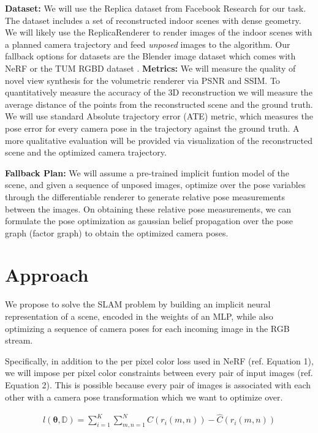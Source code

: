 \documentclass[15pt,letterpaper]{article}
\newcommand{\Db}{\mathbb{D}}
\newcommand{\thetav     }{\boldsymbol \theta     }
\begin{document}
\textbf{Dataset:} We will use the Replica dataset \cite{replica19arxiv} from Facebook Research for our task. The dataset includes a set of reconstructed indoor scenes with dense geometry. We will likely use the ReplicaRenderer to render images of the indoor scenes with a planned camera trajectory and feed \emph{unposed} images to the algorithm. Our fallback options for datasets are the Blender image dataset which comes with NeRF \cite{nerf} or the TUM RGBD dataset \cite{sturmBenchmarkEvaluationRGBD2012}.
{\bf Metrics:} We will measure the quality of novel view synthesis for the volumetric renderer via PSNR and SSIM. To quantitatively measure the accuracy of the 3D reconstruction we will measure the average distance of the points from the reconstructed scene and the ground truth. We will use standard Absolute trajectory error (ATE) metric, which measures the pose error for every camera pose in the trajectory against the ground truth. A more qualitative evaluation will be provided via visualization of the reconstructed scene and the optimized camera trajectory.

\textbf{Fallback Plan:} We will assume a pre-trained implicit funtion model of the scene, and given a sequence of unposed images, optimize over the pose variables through the differentiable renderer to generate relative pose measurements between the images. On obtaining these relative pose measurements, we can formulate the pose optimization as gaussian belief propagation over the pose graph (factor graph) to obtain the optimized camera poses.

\section{Approach}%
\label{sec:Approach}

We propose to solve the SLAM problem by building an implicit neural representation of a scene, encoded in the weights of an MLP, while also optimizing a sequence of camera poses for each incoming image in the RGB stream.

Specifically, in addition to the per pixel color loss used in NeRF (ref. Equation 1), we will impose per pixel color constraints between every pair of input images (ref. Equation 2). This is possible because every pair of images is associated with each other with a camera pose transformation which we want to optimize over.

\begin{align}
    l(\thetav, \Db) = \sum_{i = 1}^{K} \sum_{m,n = 1}^{N} C(r_i(m, n)) - \hat{C}(r_i(m,n))
\end{align}
\end{document}
